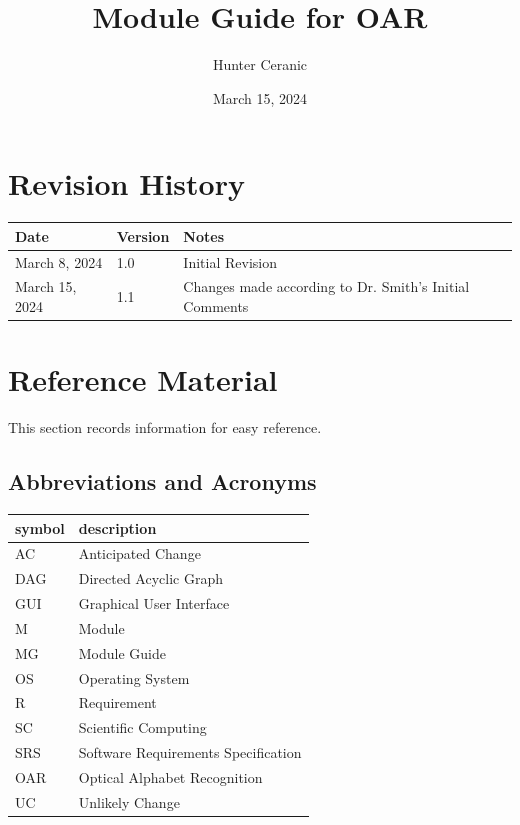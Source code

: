 \documentclass[12pt, titlepage]{article}
\begin{document}
\title{Module Guide for OAR} 
\author{Hunter Ceranic}
\date{March 15, 2024}

\maketitle


\section{Revision History}

\begin{tabularx}{\textwidth}{p{3cm}p{2cm}X}
\toprule {\bf Date} & {\bf Version} & {\bf Notes}\\
\midrule
March 8, 2024 & 1.0 & Initial Revision\\
March 15, 2024 & 1.1 & Changes made according to Dr. Smith's Initial Comments\\
\bottomrule
\end{tabularx}

\newpage

\section{Reference Material}

This section records information for easy reference.

\subsection{Abbreviations and Acronyms}

\renewcommand{\arraystretch}{1.2}
\begin{tabular}{l l} 
  \toprule		
  \textbf{symbol} & \textbf{description}\\
  \midrule 
  AC & Anticipated Change\\
  DAG & Directed Acyclic Graph \\
  GUI & Graphical User Interface \\
  M & Module \\
  MG & Module Guide \\
  OS & Operating System \\
  R & Requirement\\
  SC & Scientific Computing \\
  SRS & Software Requirements Specification\\
  OAR & Optical Alphabet Recognition\\
  UC & Unlikely Change \\
  \bottomrule
\end{tabular}\\
\end{document}
